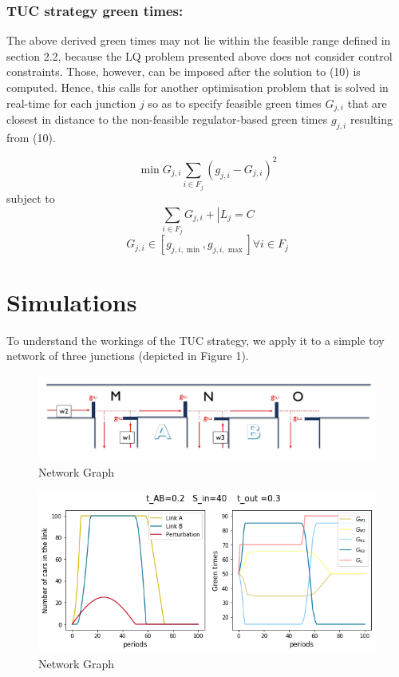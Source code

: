 \documentclass[11pt]{article}
\begin{document}
\subsubsection*{TUC strategy green times:}
The above derived green times may not lie within the feasible range defined in section 2.2, because the LQ problem presented above does not consider control constraints. Those, however, can be imposed after the solution to (10) is computed. Hence, this calls for another optimisation problem that is solved in real-time for each junction $j$ so as to specify feasible green times $G _ { j , i }$ that are closest in distance to the non-feasible regulator-based green times $g _ { j , i }$ resulting from (10).


\begin{equation} \operatorname { min } { G _ { j , i } } \sum _ { i \in F _ { j } } \left( g _ { j , i } - G _ { j , i } \right) ^ { 2 }\end{equation} 
subject to
\begin{equation} 
\sum _ { i \in F _ { j } } G _ { j , i } + \left| L _ { j } = C \right.
\end{equation} 
\begin{equation} 
G _ { j , i } \in \left[ g _ { j , i , \min } , g _ { j , i , \max } \right] \forall i \in F _ { j }
\end{equation} 

\section{Simulations}
To understand the workings of the TUC strategy, we apply it to a simple toy network of three junctions (depicted in Figure 1). 

\begin{figure}[hbt!]
    \caption{Network Graph}
      \centering
	\includegraphics[width=15cm]{network-graph}
\end{figure}

\begin{figure}[hbt!]
    \caption{Network Graph}
      \centering
	\includegraphics[width=12cm]{sim1}
\end{figure}
\end{document}
